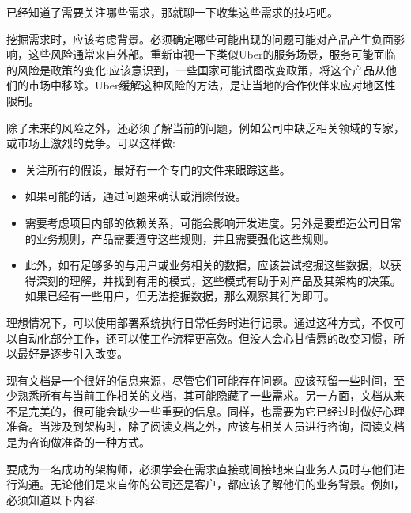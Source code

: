 
已经知道了需要关注哪些需求，那就聊一下收集这些需求的技巧吧。


挖掘需求时，应该考虑背景。必须确定哪些可能出现的问题可能对产品产生负面影响，这些风险通常来自外部。重新审视一下类似Uber的服务场景，服务可能面临的风险是政策的变化:应该意识到，一些国家可能试图改变政策，将这个产品从他们的市场中移除。Uber缓解这种风险的方法，是让当地的合作伙伴来应对地区性限制。

除了未来的风险之外，还必须了解当前的问题，例如公司中缺乏相关领域的专家，或市场上激烈的竞争。可以这样做:

\begin{itemize}
\item 
关注所有的假设，最好有一个专门的文件来跟踪这些。

\item 
如果可能的话，通过问题来确认或消除假设。

\item 
需要考虑项目内部的依赖关系，可能会影响开发进度。另外是要塑造公司日常的业务规则，产品需要遵守这些规则，并且需要强化这些规则。

\item 
此外，如有足够多的与用户或业务相关的数据，应该尝试挖掘这些数据，以获得深刻的理解，并找到有用的模式，这些模式有助于对产品及其架构的决策。如果已经有一些用户，但无法挖掘数据，那么观察其行为即可。
\end{itemize}

理想情况下，可以使用部署系统执行日常任务时进行记录。通过这种方式，不仅可以自动化部分工作，还可以使工作流程更高效。但没人会心甘情愿的改变习惯，所以最好是逐步引入改变。


现有文档是一个很好的信息来源，尽管它们可能存在问题。应该预留一些时间，至少熟悉所有与当前工作相关的文档，其可能隐藏了一些需求。另一方面，文档从来不是完美的，很可能会缺少一些重要的信息。同样，也需要为它已经过时做好心理准备。当涉及到架构时，除了阅读文档之外，应该与相关人员进行咨询，阅读文档是为咨询做准备的一种方式。


要成为一名成功的架构师，必须学会在需求直接或间接地来自业务人员时与他们进行沟通。无论他们是来自你的公司还是客户，都应该了解他们的业务背景。例如，必须知道以下内容:

